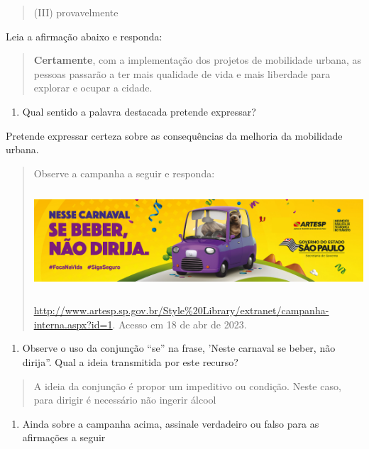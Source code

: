 {\begin{quote}
(III) provavelmente
\end{quote}

Leia a afirmação abaixo e responda:

\begin{quote}
\textbf{Certamente}, com a implementação dos projetos de mobilidade
urbana, as pessoas passarão a ter mais qualidade de vida e mais
liberdade para explorar e ocupar a cidade.
\end{quote}

\begin{enumerate}
\def\labelenumi{\arabic{enumi})}
\setcounter{enumi}{4}
\tightlist
\item
  Qual sentido a palavra destacada pretende expressar?
\end{enumerate}

Pretende expressar certeza sobre as consequências da melhoria da
mobilidade urbana.

\begin{quote}
Observe a campanha a seguir e responda:

\includegraphics[width=5.90551in,height=1.47222in]{./imgSAEB_7_POR/media/image10.png}

\href{http://www.artesp.sp.gov.br/Style\%20Library/extranet/campanha-interna.aspx?id=1}{\uline{http://www.artesp.sp.gov.br/Style\%20Library/extranet/campanha-interna.aspx?id=1}}.
Acesso em 18 de abr de 2023.
\end{quote}

\begin{enumerate}
\def\labelenumi{\arabic{enumi})}
\setcounter{enumi}{5}
\tightlist
\item
  Observe o uso da conjunção ``se'' na frase, 'Neste carnaval se beber,
  não dirija''. Qual a ideia transmitida por este recurso?
\end{enumerate}

\begin{quote}
A ideia da conjunção é propor um impeditivo ou condição. Neste caso,
para dirigir é necessário não ingerir álcool
\end{quote}

\begin{enumerate}
\def\labelenumi{\arabic{enumi})}
\setcounter{enumi}{6}
\tightlist
\item
  Ainda sobre a campanha acima, assinale verdadeiro ou falso para as
  afirmações a seguir
\end{enumerate}

}

